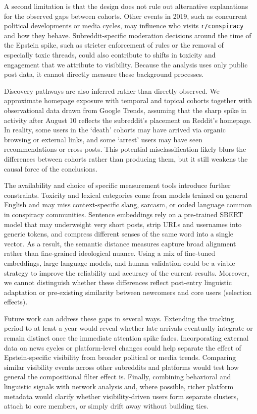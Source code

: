 \documentclass[letterpaper]{article} %
\begin{document}
A second limitation is that the design does not rule out alternative explanations for the observed gaps between cohorts. 
Other events in 2019, such as concurrent political developments or media cycles, may influence who visits \texttt{r/conspiracy} and how they behave. 
Subreddit-specific moderation decisions around the time of the Epstein spike, such as stricter enforcement of rules or the removal of especially toxic threads, could also contribute to shifts in toxicity and engagement that we attribute to visibility. 
Because the analysis uses only public post data, it cannot directly measure these background processes.

Discovery pathways are also inferred rather than directly observed. 
We approximate homepage exposure with temporal and topical cohorts together with observational data drawn from Google Trends, assuming that the sharp spike in activity after August 10 reflects the subreddit's placement on Reddit's homepage. 
In reality, some users in the `death' cohorts may have arrived via organic browsing or external links, and some `arrest' users may have seen recommendations or cross-posts. 
This potential misclassification likely blurs the differences between cohorts rather than producing them, but it still weakens the causal force of the conclusions.

The availability and choice of specific measurement tools introduce further constraints. 
Toxicity and lexical categories come from models trained on general English and may miss context-specific slang, sarcasm, or coded language common in conspiracy communities.
Sentence embeddings rely on a pre-trained SBERT model that may underweight very short posts, strip URLs and usernames into generic tokens, and compress different senses of the same word into a single vector. 
As a result, the semantic distance measures capture broad alignment rather than fine-grained ideological nuance.
Using a mix of fine-tuned embeddings, large language models, and human validation could be a viable strategy to improve the reliability and accuracy of the current results.
Moreover, we cannot distinguish whether these differences reflect post-entry linguistic adaptation or pre-existing similarity between newcomers and core users (selection effects).

Future work can address these gaps in several ways. 
Extending the tracking period to at least a year would reveal whether late arrivals eventually integrate or remain distinct once the immediate attention spike fades. 
Incorporating external data on news cycles or platform-level changes could help separate the effect of Epstein-specific visibility from broader political or media trends. 
Comparing similar visibility events across other subreddits and platforms would test how general the compositional filter effect is. 
Finally, combining behavioral and linguistic signals with network analysis and, where possible, richer platform metadata would clarify whether visibility-driven users form separate clusters, attach to core members, or simply drift away without building ties.
\end{document}

